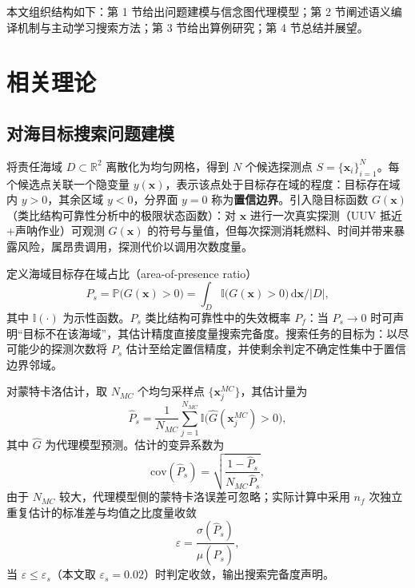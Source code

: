 \documentclass[a4paper,UTF8,zihao=5,twocolumn]{ctexart}
\numberwithin{equation}{section}
\begin{document}
本文组织结构如下：第 1 节给出问题建模与信念图代理模型；第 2 节阐述语义编译机制与主动学习搜索方法；第 3 节给出算例研究；第 4 节总结并展望。

\section{相关理论}

\subsection{对海目标搜索问题建模}

将责任海域 $D\subset\mathbb{R}^2$ 离散化为均匀网格，得到 $N$ 个候选探测点 $S=\{\symbf{x}_i\}_{i=1}^{N}$。每个候选点关联一个隐变量 $y(\symbf{x})$，表示该点处于目标存在域的程度：目标存在域内 $y>0$，其余区域 $y<0$，分界面 $y=0$ 称为\textbf{置信边界}。引入隐目标函数 $G(\symbf{x})$（类比结构可靠性分析中的极限状态函数）：对 $\symbf{x}$ 进行一次真实探测（UUV 抵近+声呐作业）可观测 $G(\symbf{x})$ 的符号与量值，但每次探测消耗燃料、时间并带来暴露风险，属昂贵调用，探测代价以调用次数度量。

定义海域目标存在域占比（area-of-presence ratio）
\begin{equation}
  P_s=\mathbb{P}\bigl(G(\symbf{x})>0\bigr)=\int_{D}\mathbb{I}\bigl(G(\symbf{x})>0\bigr)\,\mathrm{d}\symbf{x}/|D|,
  \label{eq:ps}
\end{equation}
其中 $\mathbb{I}(\cdot)$ 为示性函数。$P_s$ 类比结构可靠性中的失效概率 $P_f$：当 $P_s\to0$ 时可声明“目标不在该海域”，其估计精度直接度量搜索完备度。搜索任务的目标为：以尽可能少的探测次数将 $P_s$ 估计至给定置信精度，并使剩余判定不确定性集中于置信边界邻域。

对蒙特卡洛估计，取 $N_{MC}$ 个均匀采样点 $\{\symbf{x}_j^{MC}\}$，其估计量为
\begin{equation}
  \hat{P}_s=\frac{1}{N_{MC}}\sum_{j=1}^{N_{MC}}\mathbb{I}\bigl(\hat{G}(\symbf{x}_j^{MC})>0\bigr),
  \label{eq:mcs}
\end{equation}
其中 $\hat{G}$ 为代理模型预测。估计的变异系数为
\begin{equation}
  \mathrm{cov}(\hat P_s)=\sqrt{\frac{1-\hat P_s}{N_{MC}\hat P_s}},
  \label{eq:cov}
\end{equation}
由于 $N_{MC}$ 较大，代理模型侧的蒙特卡洛误差可忽略；实际计算中采用 $n_f$ 次独立重复估计的标准差与均值之比度量收敛
\begin{equation}
  \varepsilon=\frac{\sigma(\hat P_s)}{\mu(\hat P_s)},
  \label{eq:eps}
\end{equation}
当 $\varepsilon\leq\varepsilon_s$（本文取 $\varepsilon_s=0.02$）时判定收敛，输出搜索完备度声明。
\end{document}
